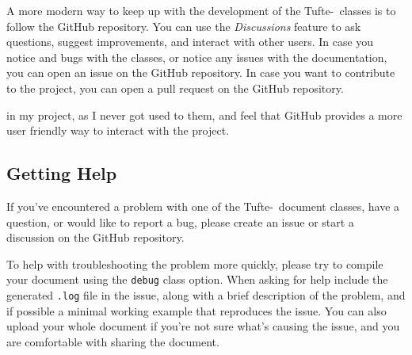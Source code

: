 \documentclass[a4paper]{tufte-handout}
\newcommand{\TL}{Tufte-\hologo{LaTeX}\xspace}
\newcommand{\hlorange}[1]{\textcolor{tufte-orange}{#1}}
\newcommand{\docclsopt}[1]{\hlorange{\texttt{#1}}}
\begin{document}
A more modern way to keep up with the development of the \TL\ classes is to follow the GitHub repository.
You can use the \textit{Discussions} feature to ask questions, suggest improvements, and interact with other users.%
In case you notice and bugs with the classes, or notice any issues with the documentation, you can open an issue on the GitHub repository.%
In case you want to contribute to the project, you can open a pull request on the GitHub repository.%

 in my project, as I never got used to them, and feel that GitHub provides a more user friendly way to interact with the project.

\subsection{Getting Help}\label{ssec:getting-help}
If you've encountered a problem with one of the \TL\ document classes, have a question, or would like to report a bug, please create an issue or start a discussion on the GitHub repository.

To help with troubleshooting the problem more quickly, please try to compile your document using the \docclsopt{debug} class option.
When asking for help include the generated \texttt{.log} file in the issue, along with a brief description of the problem, and if possible a minimal working example that reproduces the issue.
You can also upload your whole document if you're not sure what's causing the issue, and you are comfortable with sharing the document.
\end{document}
